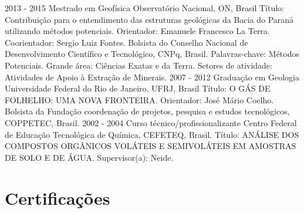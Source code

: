 \documentclass[letterpaper]{twentyonesecondcv} %
\begin{document}
{\begin{twenty}
    \twentyitem
        {2013 - 2015}
        {Mestrado em Geofísica}
        {Observatório Nacional, ON, Brasil}
	{Título: Contribuição para o entendimento das estruturas geológicas da Bacia do Paraná utilizando métodos potenciais. Orientador: Emanuele Francesco La Terra. Coorientador: Sergio Luiz Fontes. Bolsista do Conselho Nacional de Desenvolvimento Científico e Tecnológico, CNPq, Brasil. Palavras-chave: Métodos Potenciais. Grande área: Ciências Exatas e da Terra. Setores de atividade: Atividades de Apoio à Extração de Minerais.}
    \twentyitem
        {2007 - 2012}
        {Graduação em Geologia}
        {Universidade Federal do Rio de Janeiro, UFRJ, Brasil}
        {Título: O GÁS DE FOLHELHO: UMA NOVA FRONTEIRA. Orientador: José Mário Coelho. Bolsista da Fundação coordenação de projetos, pesquisa e estudos tecnológicos, COPPETEC, Brasil.}
    \twentyitem
        {2002 - 2004}
        {Curso técnico/profissionalizante}
	{Centro Federal de Educação Tecnológica de Química, CEFETEQ, Brasil.}
	{Título: ANÁLISE DOS COMPOSTOS ORGÂNICOS VOLÁTEIS E SEMIVOLÁTEIS EM AMOSTRAS DE SOLO E DE ÁGUA. Supervisor(a): Neide.}
	{}
\end{twenty}

    \section{Certificações}
    
    \begin{twentymid} %
    \end{twentymid}
    
}
\end{document}
